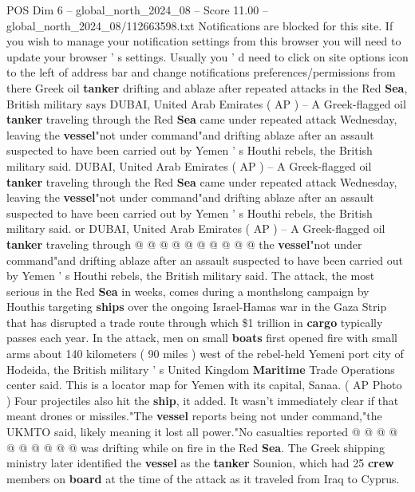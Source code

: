 \begin{textsample}{POS Dim 6 – global\_north\_2024\_08 – Score 11.00 – global\_north\_2024\_08/112663598.txt}  \label{ex:f6_pos_291}
Notifications are blocked for this site.
If you wish to manage your notification settings from this browser you will need to update your browser ' s settings.
Usually you ' d need to click on site options icon to the left of address bar and change notifications preferences/permissions from there Greek oil \textbf{tanker} drifting and ablaze after repeated attacks in the Red \textbf{Sea}, British military says DUBAI, United Arab Emirates ( AP ) -- A Greek-flagged oil \textbf{tanker} traveling through the Red \textbf{Sea} came under repeated attack Wednesday, leaving the \textbf{vessel}"not under command"and drifting ablaze after an assault suspected to have been carried out by Yemen ' s Houthi rebels, the British military said.
DUBAI, United Arab Emirates ( AP ) -- A Greek-flagged oil \textbf{tanker} traveling through the Red \textbf{Sea} came under repeated attack Wednesday, leaving the \textbf{vessel}"not under command"and drifting ablaze after an assault suspected to have been carried out by Yemen ' s Houthi rebels, the British military said. or DUBAI, United Arab Emirates ( AP ) -- A Greek-flagged oil \textbf{tanker} traveling through @ @ @ @ @ @ @ @ @ @ the \textbf{vessel}"not under command"and drifting ablaze after an assault suspected to have been carried out by Yemen ' s Houthi rebels, the British military said.
The attack, the most serious in the Red \textbf{Sea} in weeks, comes during a monthslong campaign by Houthis targeting \textbf{ships} over the ongoing Israel-Hamas war in the Gaza Strip that has disrupted a trade route through which \$1 trillion in \textbf{cargo} typically passes each year.
In the attack, men on small \textbf{boats} first opened fire with small arms about 140 kilometers ( 90 miles ) west of the rebel-held Yemeni port city of Hodeida, the British military ' s United Kingdom \textbf{Maritime} Trade Operations center said.
This is a locator map for Yemen with its capital, Sanaa. ( AP Photo ) Four projectiles also hit the \textbf{ship}, it added.
It wasn't immediately clear if that meant drones or missiles."The \textbf{vessel} reports being not under command,"the UKMTO said, likely meaning it lost all power."No casualties reported @ @ @ @ @ @ @ @ @ @ was drifting while on fire in the Red \textbf{Sea}.
The Greek shipping ministry later identified the \textbf{vessel} as the \textbf{tanker} Sounion, which had 25 \textbf{crew} members on \textbf{board} at the time of the attack as it traveled from Iraq to Cyprus.

\end{textsample}
